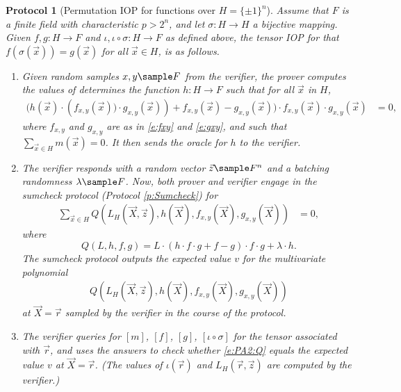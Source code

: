 \documentclass[11pt]{article}
\newtheorem{protocol}[]{Protocol}
\theoremstyle{definition}
\theoremstyle{remark}
\begin{document}
\begin{protocol}[Permutation IOP for functions over $H=\{\pm 1\}^n$]
\label{prot:pa2}
Assume that $F$ is a finite field with characteristic $p > 2^n$, and let $\sigma: H\rightarrow H$ a bijective mapping.
Given $f,g :H\rightarrow F$ and $\iota, \iota\circ\sigma: H\rightarrow F$ as defined above, the tensor IOP for that  $f(\sigma(\vec x))=g(\vec x)$ for all $\vec x\in H$,
 is as follows.
\begin{enumerate} 
\item
\label{i:pa2:step1}
Given random samples $x, y\sample F$ from the verifier, the prover computes the values of
determines the function $h:H\rightarrow F$ such that for all $\vec x$ in $H$, 
\begin{align*} 
	\Big(h(\vec x)\cdot \left( f_{x,y}(\vec x))\cdot g_{x,y}(\vec x) \right) + f_{x,y}(\vec x) - g_{x,y}(\vec x)\Big)\cdot  f_{x,y}(\vec x)\cdot g_{x,y}(\vec x) &= 0,
\end{align*}
where $f_{x,y}$ and $g_{x,y}$ are as in \eqref{e:fxy} and \eqref{e:gxy}, and such that $\sum_{\vec x\in H} m(\vec x) = 0$.
It then sends the oracle for $h$ to the verifier.

\item
\label{i:pa2:step2}
The verifier responds with a random vector $\vec z \sample F^n$ and a batching randomness $\lambda\sample F$.
Now, both prover and verifier engage in the sumcheck protocol (Protocol \ref{p:Sumcheck}) for 
\begin{align*} 
	\sum_{\vec x \in H} Q(L_H(\vec X, \vec z), h(\vec X),  f_{x,y}(\vec X),  g_{x,y}(\vec X))&= 0,
\end{align*}
where 
\begin{equation*}
Q(L, h, f, g) =   
L \cdot  \left(h\cdot f\cdot g + f - g\right)\cdot  f \cdot g +  \lambda \cdot h.
\end{equation*}
The sumcheck protocol outputs the expected value $v$ for the multivariate polynomial 
\begin{equation}
\label{e:PA2:Q}
\begin{aligned}
Q(L_H(\vec X, \vec z), h(\vec X), f_{x,y}(\vec X),  g_{x,y}(\vec X))
\end{aligned}
\end{equation}
at $\vec X=\vec r$ sampled by the verifier in the course of the protocol.

\item
The verifier queries for  $[m]$, $[f]$, $[g]$, $[\iota\circ\sigma]$ for the tensor associated with $\vec r$, and uses the answers 
to check whether \eqref{e:PA2:Q} equals the expected value $v$ at $\vec X = \vec r$. 
(The values of $\iota(\vec r)$ and $L_H(\vec r, \vec z)$ are computed by the verifier.)
\end{enumerate}
\end{protocol}
\end{document}
